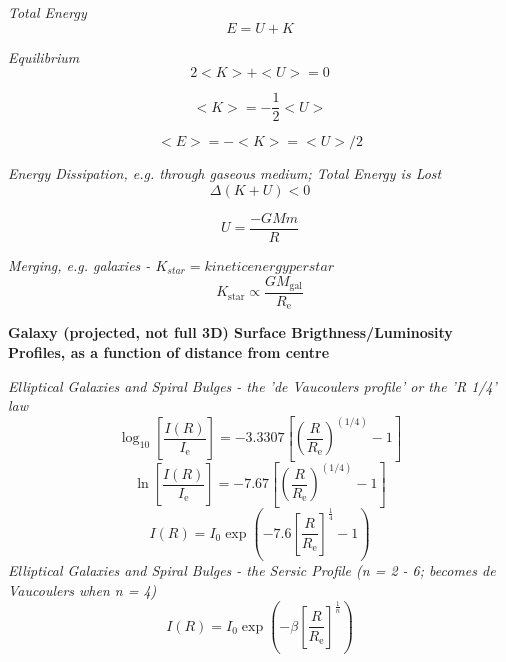 \documentclass{article}
\begin{document}
\textit {Total Energy}
\begin{equation}
E = U + K
\end{equation}

\textit {Equilibrium}
\begin{equation}
2 <K> + <U> = 0
\end{equation}

\begin{equation}
<K> = -\frac {1}{2} <U>
\end{equation}

\begin{equation}
<E> = - <K> = <U> / 2
\end{equation}

\textit {Energy Dissipation, e.g. through gaseous medium; Total Energy is Lost}
\begin{equation}
\Delta \left(K + U\right) < 0
\end{equation}

\begin{equation}
U = \frac {-GMm}{R}
\end{equation}

\textit {Merging, e.g. galaxies - \(K_{star} = kinetic energy per star\)}
\begin{equation}
K_\mathrm{star} \propto \frac {G M_\mathrm{gal}}{R_\mathrm{e}}
\end{equation}


\textbf {Galaxy (projected, not full 3D) Surface Brigthness/Luminosity Profiles, as a function of distance from centre}

\textit {Elliptical Galaxies and Spiral Bulges - the 'de Vaucoulers profile' or the 'R 1/4' law}
\begin{equation}
\log_\mathrm{10} \left[ \frac {I(R)}{I_\mathrm{e}} \right] = - 3.3307 \left[ \left( \frac {R}{R_\mathrm{e}} \right)^{(1/4)} - 1 \right]
\end{equation}
\begin{equation}
\ln \left[ \frac {I(R)}{I_\mathrm{e}} \right] = - 7.67 \left[ \left( \frac {R}{R_\mathrm{e}} \right)^{(1/4)} - 1 \right]
\end{equation}
\begin{equation}
I(R) = I_0 \exp\left(-7.6 \left[\frac {R}{R_\mathrm{e}} \right]^ \frac {1}{4} -1 \right)
\end{equation}
\textit {Elliptical Galaxies and Spiral Bulges - the Sersic Profile (n = 2 - 6; becomes de Vaucoulers when n = 4)}
\begin{equation}
I(R) = I_0 \exp\left(-\beta \left[\frac {R}{R_\mathrm{e}} \right]^ \frac {1}{n}\right)
\end{equation}
\end{document}
